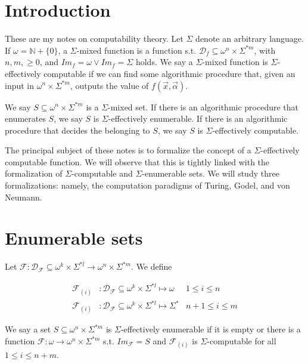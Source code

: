 \documentclass[a4paper, 12pt]{article}
\begin{document}
\section{Introduction}

These are my notes on computability theory. Let $\Sigma$ denote an arbitrary
language. If $\omega = \mathbb{N} + \{ 0\}$, a $\Sigma$-mixed function is a
function s.t. $\mathcal{D}_f \subseteq \omega^n \times \Sigma^{*m}$, with $n, m,
\geq 0$, and $Im_f = \omega \lor Im_f = \Sigma$ holds. We say a $\Sigma$-mixed
function is $\Sigma$-effectively computable if we can find some algorithmic
procedure that, given an input in $\omega^n \times \Sigma^{*m}$, outputs the
value of $f(\overrightarrow{x}, \overrightarrow{\alpha})$. 

We say $S \subseteq \omega^n \times \Sigma^{*m}$ is a $\Sigma$-mixed set. If
there is an algorithmic procedure that enumerates $S$, we say $S$ is
$\Sigma$-effectively enumerable. If there is an algorithmic procedure that decides
the belonging to $S$, we say $S$ is $\Sigma$-effectively computable.


The principal subject of these notes is to formalize the concept of a
$\Sigma$-effectively computable function. We will observe that this is tightly
linked with the formalization of $\Sigma$-computable and $\Sigma$-enumerable
sets. We will study three formalizations: namely, the computation paradigms of
Turing, Godel, and von Neumann.

\section{Enumerable sets}

Let $\mathcal{F} : \mathcal{D}_{\mathcal{F}} \subseteq \omega^{k} \times \Sigma^{*l} \to \omega^n
\times \Sigma^{*m}$. We define

\begin{align*}
    \mathcal{F}_{(i)} &: \mathcal{D}_{\mathcal{F}} \subseteq \omega^{k} \times
    \Sigma^{*l}  \mapsto \omega & 1 \leq i \leq n\\
    \mathcal{F}_{(i)} &: \mathcal{D}_{\mathcal{F}} \subseteq \omega^{k} \times
    \Sigma^{*l} \mapsto  \Sigma^{*} & n + 1 \leq i \leq m
\end{align*}

We say a set $S \subseteq \omega^n \times \Sigma^{*m} $ is $\Sigma$-effectively
enumerable  if it is empty or there is a function $\mathcal{F} : \omega \to
\omega^n \times \Sigma^{*m}$ s.t. $Im_{\mathcal{F}} = S$ and $\mathcal{F}_{(i)}$
is $\Sigma$-computable for all $1 \leq i \leq n + m$.
\end{document}
